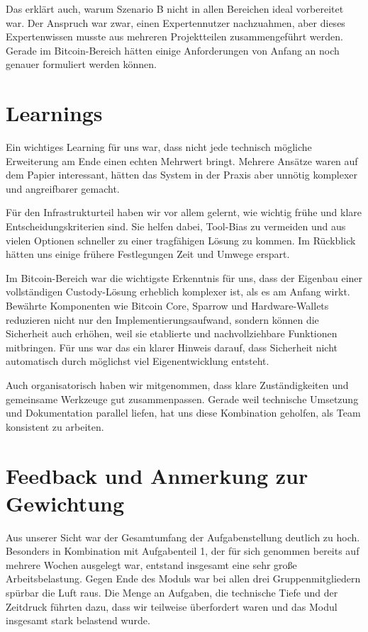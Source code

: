 Das erklärt auch, warum Szenario B nicht in allen Bereichen ideal vorbereitet war. Der Anspruch war zwar, einen Expertennutzer nachzuahmen, aber dieses Expertenwissen musste aus mehreren Projektteilen zusammengeführt werden. Gerade im Bitcoin-Bereich hätten einige Anforderungen von Anfang an noch genauer formuliert werden können.


\section{Learnings}
Ein wichtiges Learning für uns war, dass nicht jede technisch mögliche Erweiterung am Ende einen echten Mehrwert bringt. Mehrere Ansätze waren auf dem Papier interessant, hätten das System in der Praxis aber unnötig komplexer und angreifbarer gemacht.

Für den Infrastrukturteil haben wir vor allem gelernt, wie wichtig frühe und klare Entscheidungskriterien sind. Sie helfen dabei, Tool-Bias zu vermeiden und aus vielen Optionen schneller zu einer tragfähigen Lösung zu kommen. Im Rückblick hätten uns einige frühere Festlegungen Zeit und Umwege erspart.

Im Bitcoin-Bereich war die wichtigste Erkenntnis für uns, dass der Eigenbau einer vollständigen Custody-Lösung erheblich komplexer ist, als es am Anfang wirkt. Bewährte Komponenten wie Bitcoin Core, Sparrow und Hardware-Wallets reduzieren nicht nur den Implementierungsaufwand, sondern können die Sicherheit auch erhöhen, weil sie etablierte und nachvollziehbare Funktionen mitbringen. Für uns war das ein klarer Hinweis darauf, dass Sicherheit nicht automatisch durch möglichst viel Eigenentwicklung entsteht.

Auch organisatorisch haben wir mitgenommen, dass klare Zuständigkeiten und gemeinsame Werkzeuge gut zusammenpassen. Gerade weil technische Umsetzung und Dokumentation parallel liefen, hat uns diese Kombination geholfen, als Team konsistent zu arbeiten.


\section{Feedback und Anmerkung zur Gewichtung}

Aus unserer Sicht war der Gesamtumfang der Aufgabenstellung deutlich zu hoch. Besonders in Kombination mit Aufgabenteil 1, der für sich genommen bereits auf mehrere Wochen ausgelegt war, entstand insgesamt eine sehr große Arbeitsbelastung. Gegen Ende des Moduls war bei allen drei Gruppenmitgliedern spürbar die Luft raus. Die Menge an Aufgaben, die technische Tiefe und der Zeitdruck führten dazu, dass wir teilweise überfordert waren und das Modul insgesamt stark belastend wurde.

